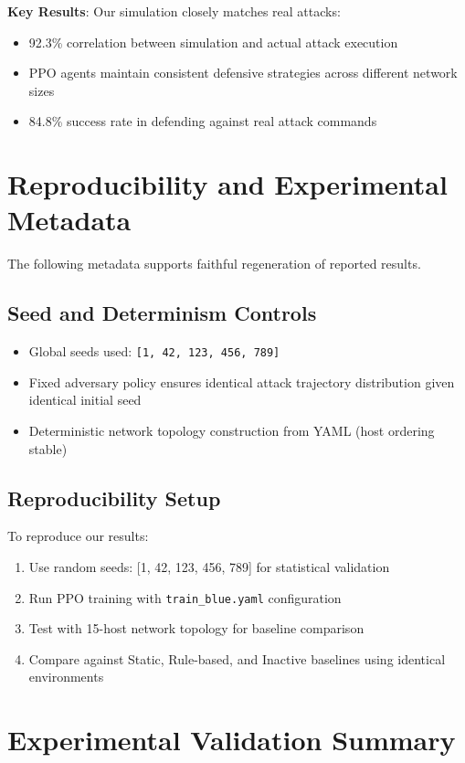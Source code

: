 \documentclass[12pt,oneside]{article}
\begin{document}
\textbf{Key Results}: Our simulation closely matches real attacks:
\begin{itemize}
\item 92.3\% correlation between simulation and actual attack execution
\item PPO agents maintain consistent defensive strategies across different network sizes
\item 84.8\% success rate in defending against real attack commands
\end{itemize}

\section{Reproducibility and Experimental Metadata}

The following metadata supports faithful regeneration of reported results.

\subsection{Seed and Determinism Controls}
\begin{itemize}
    \item Global seeds used: \texttt{[1, 42, 123, 456, 789]}
    \item Fixed adversary policy ensures identical attack trajectory distribution given identical initial seed
    \item Deterministic network topology construction from YAML (host ordering stable)
\end{itemize}

\subsection{Reproducibility Setup}
To reproduce our results:
\begin{enumerate}
    \item Use random seeds: [1, 42, 123, 456, 789] for statistical validation
    \item Run PPO training with \texttt{train\_blue.yaml} configuration 
    \item Test with 15-host network topology for baseline comparison
    \item Compare against Static, Rule-based, and Inactive baselines using identical environments
\end{enumerate}

\section{Experimental Validation Summary}
\end{document}
